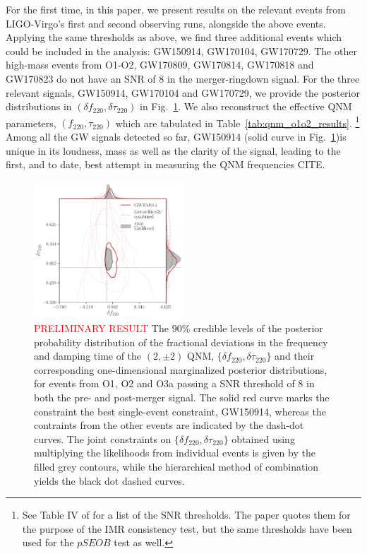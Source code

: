 \documentclass[twocolumn,prd,superscriptaddress,amsfonts,amssymb,amsmath,preprintnumbers]{revtex4-1}
\newcommand{\df}[1]{\delta f_{\text{#1}}}
\newcommand{\dtau}[1]{\delta \tau_{\text{#1}}}
\newcommand{\fngr}[1]{f_{\text{#1}}}
\newcommand{\taungr}[1]{\tau_{\text{#1}}}
\begin{document}
For the first time, in this paper, we present results on the relevant events from LIGO-Virgo's first and second observing runs, alongside the above events. Applying the same thresholds as above, we find three additional events which could be included in the analysis: GW150914, GW170104, GW170729. The other high-mass events from O1-O2, GW170809, GW170814, GW170818 and GW170823 do not have an SNR of $8$ in the merger-ringdown signal. For the three relevant signals, GW150914, GW170104 and GW170729, we provide the posterior distributions in $(\df{220}, \dtau{220})$ in Fig.~\ref{fig:o1o2_events}. We also reconstruct the effective QNM parameters, $(\fngr{220}, \taungr{220})$ which are tabulated in Table~\ref{tab:qnm_o1o2_results}. \footnote{See Table IV of \cite{Abbott:2020jks} for a list of the SNR thresholds. The paper quotes them for the purpose of the IMR consistency test, but the same thresholds have been used for the $pSEOB$ test as well.} Among all the GW signals detected so far, GW150914 (solid curve in Fig.~\ref{fig:o1o2_events})is unique in its loudness, mass as well as the clarity of the signal, leading to the first, and to date, best attempt in measuring the QNM frequencies CITE.

\begin{figure}[h!]
	\includegraphics[width=0.5\textwidth]{figures/rin_pseob_results.pdf}
	\caption{\textcolor{red}{PRELIMINARY RESULT} The 90\% credible levels of the posterior probability distribution of the fractional deviations in the frequency and damping time of the $(2,\pm 2)$ QNM, $\{\df{220},\dtau{220}\}$ and their corresponding one-dimensional marginalized posterior distributions, for events from O1, O2 and O3a passing a SNR threshold of $8$ in both the pre- and post-merger signal. The solid red curve marks the constraint the best single-event constraint, GW150914, whereas the contraints from the other events are indicated by the dash-dot curves. The joint constraints on $\{\df{220},\dtau{220}\}$ obtained using multiplying the likelihoods from individual events is given by the filled grey contours, while the hierarchical method of combination yields the black dot dashed curves.}
	\label{fig:o1o2_events}
\end{figure}
\end{document}
